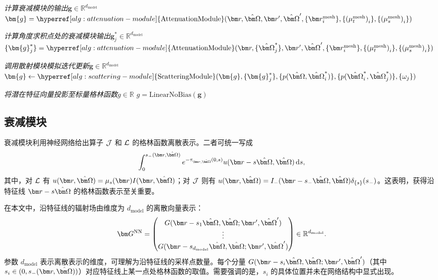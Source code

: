 \begin{algorithm}[htp!]
    \caption{格林函数}\label{alg:green-function}
    \SetAlgoLined

    \BlankLine

    \emph{计算衰减模块的输出$\bm{g}\in \mathbb{R}^{d_{\text{model}}}$}\;
    $\bm{g}=\hyperref[alg:attenuation-module]{\text{AttenuationModule}}(\br,\bOmega,\br^{\prime},\bOmega^{\prime},\{\br_i^{\text{mesh}}\},\{{(\mut^{\text{mesh}})}_i\},\{{(\mus^{\text{mesh}})}_i\})$\;

    \emph{计算角度求积点处的衰减模块输出$\bm{g}^*_j\in \mathbb{R}^{d_{\text{model}}}$}\;
    $\{\bm{g}^*_j\}=\hyperref[alg:attenuation-module]{\text{AttenuationModule}}(\br,\{\bOmega_j^*\},\br^{\prime},\bOmega^{\prime},\{\br_i^{\mathrm{mesh}}\},\{{(\mut^{\mathrm{mesh}})}_i\}, \{{(\mus^{\mathrm{mesh}})}_i\})$\;

    \emph{调用散射模块模拟迭代更新$\bm{g}\in \mathbb{R}^{d_{\text{model}}}$}\;
    $\bm{g}\gets\hyperref[alg:scattering-module]{\text{ScatteringModule}}(\bm{g}, \{\bm{g}^*_j\}, \{p(\bOmega,\bOmega^*_i)\},\{p(\bOmega^*_i,\bOmega^*_j)\}, \{\omega_j\})$\;

    \emph{将潜在特征向量投影至标量格林函数$g\in\mathbb{R}$}\;
    $g = \text{LinearNoBias}(\bm{g})$\;

    \;
\end{algorithm}

\subsection{衰减模块}\label{sec:attenuation-module}

衰减模块利用神经网络给出算子 $\mathcal{J}$ 和 $\mathcal{L}$ 的格林函数离散表示。二者可统一写成
\begin{equation}\label{eq:L-op}
    \int_0^{s_{-}(\br, \bOmega)} e^{-\tau_{\br,\bOmega}(0,s)}u(\br-s\bOmega, \bOmega)\diff{s},
\end{equation}
其中，对 $\mathcal{L}$ 有 $u(\br, \bOmega)=\mus(\br)I(\br, \bOmega)$；对 $\mathcal{J}$ 则有 $u(\br, \bOmega)=I_-(\br-s_-\bOmega, \bOmega)\delta_{\{s\}}(s_-)$。这表明，获得沿特征线 $\br-s \bOmega$ 的格林函数表示至关重要。

在本文中，沿特征线的辐射场由维度为 $d_{\text{model}}$ 的离散向量表示：
\begin{equation}
    \bG^{\text{NN}} =
    \begin{pmatrix}
        G(\br-s_1 \bOmega, \bOmega; \br', \bOmega') \\
        \vdots                                      \\
        G(\br-s_{d_{\text{model}}} \bOmega, \bOmega; \br', \bOmega')
    \end{pmatrix}\in \mathbb{R}^{d_{\text{model}}}.
\end{equation}
参数 $d_{\text{model}}$ 表示离散表示的维度，可理解为沿特征线的采样点数量。每个分量 $G(\br-s_i \bOmega, \bOmega; \br', \bOmega')$（其中 $s_i\in (0,s_-(\br,\bOmega))$）对应特征线上某一点处格林函数的取值。需要强调的是，$s_i$ 的具体位置并未在网络结构中显式出现。

